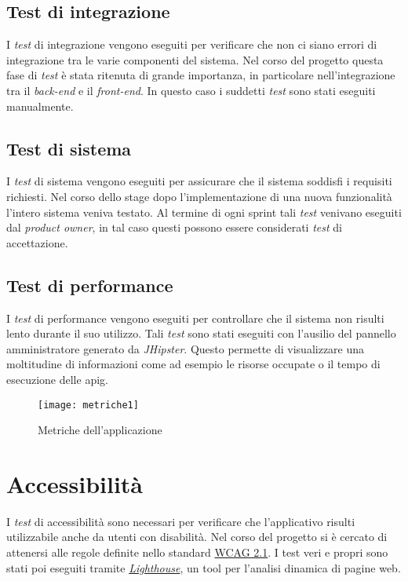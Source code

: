 \subsection{Test di integrazione}
I \textit{test} di integrazione vengono eseguiti per verificare che non ci siano errori di integrazione tra le varie componenti del sistema. Nel corso del progetto questa fase di \textit{test} è stata ritenuta di grande importanza, in particolare nell'integrazione tra il \textit{back-end} e il \textit{front-end}. In questo caso i suddetti \textit{test} sono stati eseguiti manualmente. 

\subsection{Test di sistema}
I \textit{test} di sistema vengono eseguiti per assicurare che il sistema soddisfi i requisiti richiesti. Nel corso dello stage dopo l'implementazione di una nuova funzionalità l'intero sistema veniva testato. Al termine di ogni sprint tali \textit{test} venivano eseguiti dal \textit{product owner}, in tal caso questi possono essere considerati \textit{test} di accettazione.

\subsection{Test di performance}
I \textit{test} di performance vengono eseguiti per controllare che il sistema non risulti lento durante il suo utilizzo. Tali \textit{test} sono stati eseguiti con l'ausilio del pannello amministratore generato da \textit{JHipster}. Questo permette di visualizzare una moltitudine di informazioni come ad esempio le risorse occupate o il tempo di esecuzione delle \gls{apig}.
\begin{figure}[h]
    \begin{center}
    \texttt{[image: metriche1]}
    \caption{Metriche dell'applicazione}
    \label{fig:figure31}
    \end{center}
\end{figure}

\section{Accessibilità}
I \textit{test} di accessibilità sono necessari per verificare che l'applicativo risulti utilizzabile anche da utenti con disabilità. Nel corso del progetto si è cercato di attenersi alle regole definite nello standard \href{https://www.w3.org/TR/WCAG21/}{WCAG 2.1}. I test veri e propri sono stati poi eseguiti tramite \href{https://developers.google.com/web/tools/lighthouse/?utm_source=devtools}{\textit{Lighthouse}}, un tool per l'analisi dinamica di pagine web.